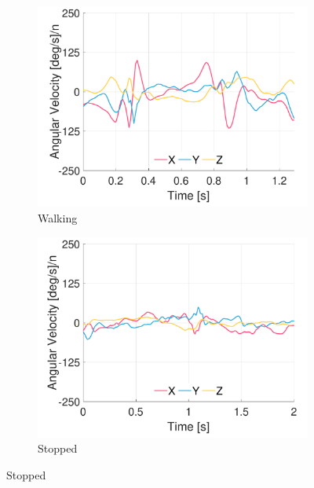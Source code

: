 \begin{figure}[p]
\centering
    \begin{subfigure}[b]{0.49\textwidth}
         \centering
         \includegraphics[width=\textwidth]{content/3-Methods/example-data/ch3_example_data_subject_01_r_hip_gyro_activity_walking.pdf}
         \caption{Walking}
    \end{subfigure}
    \begin{subfigure}[b]{0.49\textwidth}
         \centering
         \includegraphics[width=\textwidth]{content/3-Methods/example-data/ch3_example_data_subject_01_r_hip_gyro_activity_stop.pdf}
         \caption{Stopped}
    \end{subfigure}
    

\end{figure}
